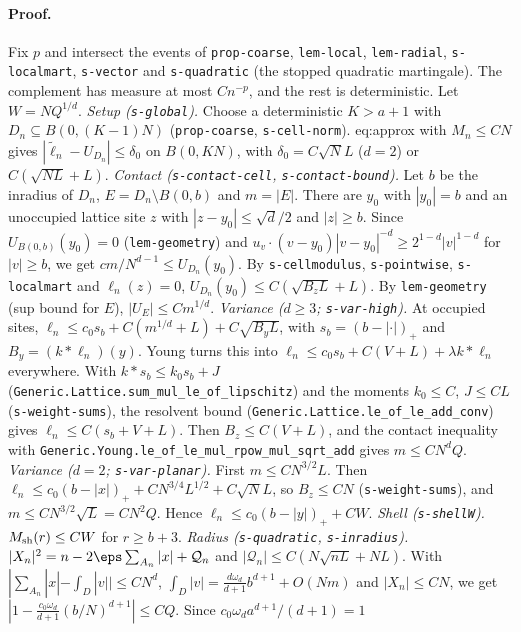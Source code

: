 \paragraph{Proof.} Fix $p$ and intersect the events of \texttt{prop-coarse}, \texttt{lem-local},
\texttt{lem-radial}, \texttt{s-localmart}, \texttt{s-vector} and \texttt{s-quadratic} (the stopped
quadratic martingale). The complement has measure at most $Cn^{-p}$, and the rest is deterministic.
Let $W=NQ^{1/d}$.
\emph{Setup (\texttt{s-global}).} Choose a deterministic $K>a+1$ with $D_n\subseteq B(0,(K-1)N)$
(\texttt{prop-coarse}, \texttt{s-cell-norm}). eq:approx with $M_n\le CN$ gives
$|\widetilde\ell_n-U_{D_n}|\le\delta_0$ on $B(0,KN)$, with $\delta_0=C\sqrt NL$ ($d=2$) or
$C(\sqrt{NL}+L)$.
\emph{Contact (\texttt{s-contact-cell}, \texttt{s-contact-bound}).} Let $b$ be the inradius of $D_n$,
$E=D_n\setminus B(0,b)$ and $m=|E|$. There are $y_0$ with $|y_0|=b$ and an unoccupied lattice site
$z$ with $|z-y_0|\le\sqrt d/2$ and $|z|\ge b$. Since $U_{B(0,b)}(y_0)=0$ (\texttt{lem-geometry}) and
$u_v\cdot(v-y_0)|v-y_0|^{-d}\ge2^{1-d}|v|^{1-d}$ for $|v|\ge b$, we get $cm/N^{d-1}\le U_{D_n}(y_0)$.
By \texttt{s-cellmodulus}, \texttt{s-pointwise}, \texttt{s-localmart} and $\ell_n(z)=0$,
$U_{D_n}(y_0)\le C(\sqrt{B_zL}+L)$. By \texttt{lem-geometry} (sup bound for $E$), $|U_E|\le Cm^{1/d}$.
\emph{Variance ($d\ge3$; \texttt{s-var-high}).} At occupied sites,
$\ell_n\le c_0s_b+C(m^{1/d}+L)+C\sqrt{B_yL}$, with $s_b=(b-|\cdot|)_+$ and $B_y=(k*\ell_n)(y)$. Young
turns this into $\ell_n\le c_0s_b+C(V+L)+\lambda k*\ell_n$ everywhere. With
$k*s_b\le k_0s_b+J$ (\texttt{Generic.Lattice.sum\_mul\_le\_of\_lipschitz}) and the moments
$k_0\le C$, $J\le CL$ (\texttt{s-weight-sums}), the resolvent bound
(\texttt{Generic.Lattice.le\_of\_le\_add\_conv}) gives $\ell_n\le C(s_b+V+L)$. Then $B_z\le C(V+L)$,
and the contact inequality with \texttt{Generic.Young.le\_of\_le\_mul\_rpow\_mul\_sqrt\_add} gives
$m\le CN^dQ$.
\emph{Variance ($d=2$; \texttt{s-var-planar}).} First $m\le CN^{3/2}L$. Then
$\ell_n\le c_0(b-|x|)_++CN^{3/4}L^{1/2}+C\sqrt NL$, so $B_z\le CN$ (\texttt{s-weight-sums}), and
$m\le CN^{3/2}\sqrt L=CN^2Q$. Hence $\ell_n\le c_0(b-|y|)_++CW$.
\emph{Shell (\texttt{s-shellW}).} $M_{\rm sh}(r)\le CW$ for $r\ge b+3$.
\emph{Radius (\texttt{s-quadratic}, \texttt{s-inradius}).} $|X_n|^2=n-2\eps\sum_{A_n}|x|+\mathcal Q_n$ and
$|\mathcal Q_n|\le C(N\sqrt{nL}+NL)$. With $|\sum_{A_n}|x|-\int_D|v||\le CN^d$,
$\int_D|v|=\frac{d\omega_d}{d+1}b^{d+1}+O(Nm)$ and $|X_n|\le CN$, we get
$|1-\frac{c_0\omega_d}{d+1}(b/N)^{d+1}|\le CQ$. Since $c_0\omega_da^{d+1}/(d+1)=1$
